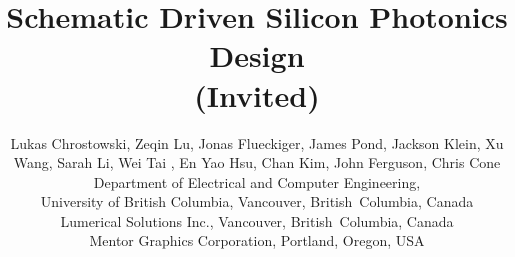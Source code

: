 \documentclass[journal]{spie}
\begin{document}
\title{Schematic Driven Silicon Photonics Design \\
(Invited)}

\author{Lukas Chrostowski, 
Zeqin Lu, 
Jonas Flueckiger,
James Pond, 
Jackson Klein,
Xu Wang,
Sarah Li, 
Wei Tai , 
En Yao Hsu, 
Chan Kim, 
John Ferguson,
Chris Cone
\skiplinehalf
{}Department of Electrical and Computer Engineering, \\
University of British Columbia, Vancouver, British~Columbia, Canada \\
Lumerical Solutions Inc.,  Vancouver, British~Columbia, Canada \\
Mentor Graphics Corporation, Portland, Oregon, USA
}

\maketitle



%
%
%
\lstset{columns=flexible}
\end{document}
